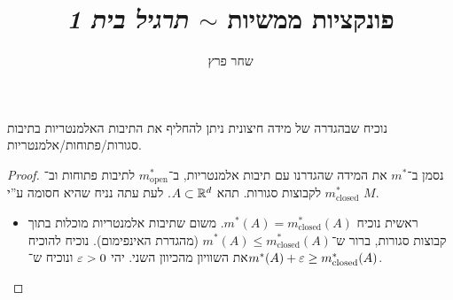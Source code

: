 \documentclass[]{../../../../tex/classes/homework}
\author{שחר פרץ}
\title{פונקציות ממשיות $\sim$ \textit{תרגיל בית 1}}
\newcommand\mo {m^*_{\mathrm{open}}}
\newcommand\mc {m^*_{\mathrm{closed}}}
\begin{document}
	\maketitle
	\section{}
	נוכיח שבהגדרה של מידה חיצונית ניתן להחליף את התיבות האלמנטריות בתיבות סגורות/פתוחות/אלמנטריות. 
	
	\begin{proof}
		נסמן ב־$m^*$ את המידה שהגדרנו עם תיבות אלמנטריות, ב־$\mo$ לתיבות פתוחות וב־$\mc$ לקבוצות סגורות. תהא $A \subset \mathbb{R}^{d}$. לעת עתה נניח שהיא חסומה ע''י $M$. 
		\begin{itemize}
			\item ראשית נוכיח $m^*(A) = \mc(A)$. משום שתיבות אלמנטריות מוכלות בתוך קבוצות סגורות, ברור ש־$m^*(A) \le \mc(A)$ (מהגדרת האינפימום). נוכיח להוכיח את השוויון מהכיוון השני. יהי $\eg > 0$ ונוכיח ש־$m^*(A) + \eg \ge \mc(A)$. 
			

\end{itemize}
\end{proof}
\end{document}
